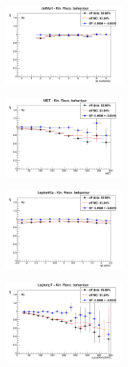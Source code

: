 \begin{figure}[t]
\centering
\begin{subfigure}
  \centering
  \includegraphics[width=0.49\textwidth]{05_kinReco/plots/eff_SF/KinRecoEff_JetMult.png}
\end{subfigure}
\begin{subfigure}
  \centering
  \includegraphics[width=0.49\textwidth]{05_kinReco/plots/eff_SF/KinRecoEff_MET.png}
\end{subfigure}
\begin{subfigure}
  \centering
  \includegraphics[width=0.49\textwidth]{05_kinReco/plots/eff_SF/KinRecoEff_LeptonEta.png}
\end{subfigure}
\begin{subfigure}
  \centering
  \includegraphics[width=0.49\textwidth]{05_kinReco/plots/eff_SF/KinRecoEff_LeptonpT.png}

\end{subfigure}
\end{figure}
